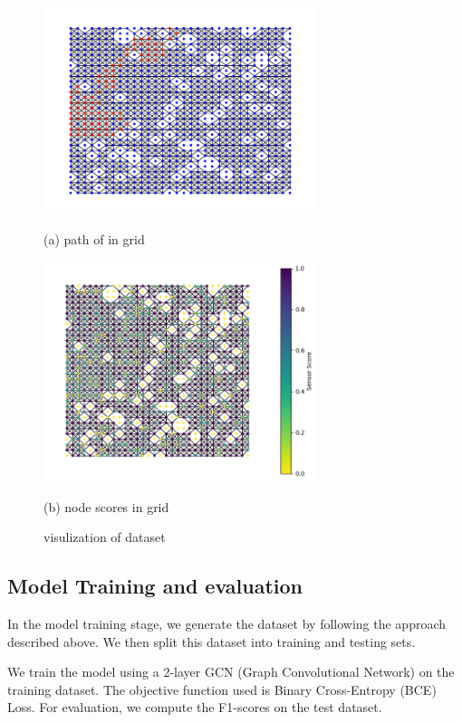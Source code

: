 \documentclass{article}
\begin{document}
\begin{figure}[htb]
  \begin{minipage}[b]{1.0\linewidth}
    \centering
    \centerline{\includegraphics[width=8.0cm]{images/path}}
    \centerline{(a) path of in grid}\medskip
  \end{minipage}
  \hfill
  \begin{minipage}[b]{1.0\linewidth}
    \centering
    \centerline{\includegraphics[width=8.0cm]{images/scores}}
    \centerline{(b) node scores in grid }\medskip
  \end{minipage}
  \caption{visulization of dataset}
  \label{fig:data}
  \end{figure}

  \subsection{Model Training and evaluation}
  \label{ssec:model}

  In the model training stage, we generate the dataset by following the approach described above. We then split this dataset into training and testing sets.

  We train the model using a 2-layer GCN (Graph Convolutional Network) on the training dataset. The objective function used is Binary Cross-Entropy (BCE) Loss.
  For evaluation, we compute the F1-scores on the test dataset.
\end{document}
